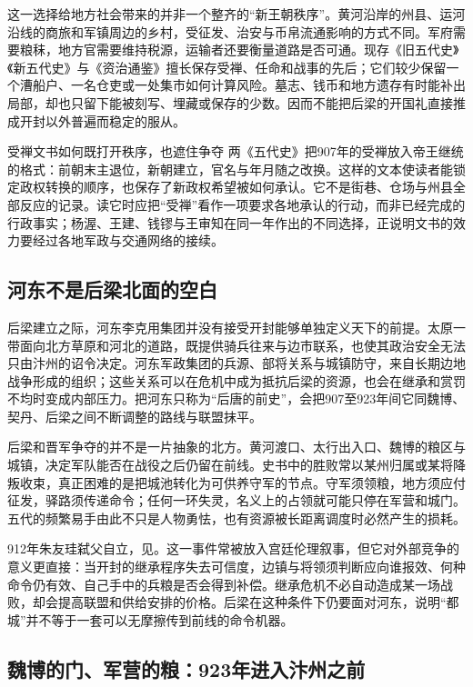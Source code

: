 这一选择给地方社会带来的并非一个整齐的“新王朝秩序”。黄河沿岸的州县、运河沿线的商旅和军镇周边的乡村，受征发、治安与币帛流通影响的方式不同。军府需要粮秣，地方官需要维持税源，运输者还要衡量道路是否可通。现存《旧五代史》《新五代史》与《资治通鉴》擅长保存受禅、任命和战事的先后；它们较少保留一个漕船户、一名仓吏或一处集市如何计算风险。墓志、钱币和地方遗存有时能补出局部，却也只留下能被刻写、埋藏或保存的少数。因而不能把后梁的开国礼直接推成开封以外普遍而稳定的服从。

\begin{textwindow}{受禅文书如何既打开秩序，也遮住争夺}
两《五代史》把907年的受禅放入帝王继统的格式：前朝末主退位，新朝建立，官名与年月随之改换。这样的文本使读者能锁定政权转换的顺序，也保存了新政权希望被如何承认。它不是街巷、仓场与州县全部反应的记录。读它时应把“受禅”看作一项要求各地承认的行动，而非已经完成的行政事实；杨渥、王建、钱镠与王审知在同一年作出的不同选择，正说明文书的效力要经过各地军政与交通网络的接续。
\end{textwindow}

\subsection{河东不是后梁北面的空白}

后梁建立之际，河东李克用集团并没有接受开封能够单独定义天下的前提。太原一带面向北方草原和河北的道路，既提供骑兵往来与边市联系，也使其政治安全无法只由汴州的诏令决定。河东军政集团的兵源、部将关系与城镇防守，来自长期边地战争形成的组织；这些关系可以在危机中成为抵抗后梁的资源，也会在继承和赏罚不均时变成内部压力。把河东只称为“后唐的前史”，会把907至923年间它同魏博、契丹、后梁之间不断调整的路线与联盟抹平。

后梁和晋军争夺的并不是一片抽象的北方。黄河渡口、太行出入口、魏博的粮区与城镇，决定军队能否在战役之后仍留在前线。史书中的胜败常以某州归属或某将降叛收束，真正困难的是把城池转化为可供养守军的节点。守军须领粮，地方须应付征发，驿路须传递命令；任何一环失灵，名义上的占领就可能只停在军营和城门。五代的频繁易手由此不只是人物勇怯，也有资源被长距离调度时必然产生的损耗。

912年朱友珪弑父自立，见。这一事件常被放入宫廷伦理叙事，但它对外部竞争的意义更直接：当开封的继承程序失去可信度，边镇与将领须判断应向谁报效、何种命令仍有效、自己手中的兵粮是否会得到补偿。继承危机不必自动造成某一场战败，却会提高联盟和供给安排的价格。后梁在这种条件下仍要面对河东，说明“都城”并不等于一套可以无摩擦传到前线的命令机器。

\subsection{魏博的门、军营的粮：923年进入汴州之前}

